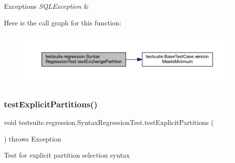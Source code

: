 \begin{DoxyExceptions}{Exceptions}
{\em S\+Q\+L\+Exception} & \\
\hline
\end{DoxyExceptions}
Here is the call graph for this function\+:
\nopagebreak
\begin{figure}[H]
\begin{center}
\leavevmode
\includegraphics[width=350pt]{classtestsuite_1_1regression_1_1_syntax_regression_test_a27af4a565f65e6f33db3e05e87a2035a_cgraph}
\end{center}
\end{figure}
\mbox{\label{classtestsuite_1_1regression_1_1_syntax_regression_test_a4aacde39fa83ec7ba0436c5eb372a98d}} 
\subsubsection{\texorpdfstring{test\+Explicit\+Partitions()}{testExplicitPartitions()}}
{\footnotesize\ttfamily void testsuite.\+regression.\+Syntax\+Regression\+Test.\+test\+Explicit\+Partitions (\begin{DoxyParamCaption}{ }\end{DoxyParamCaption}) throws Exception}

Test for explicit partition selection syntax


